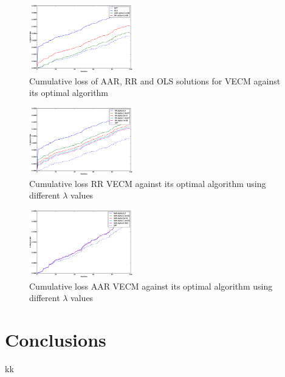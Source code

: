 \documentclass[twocolumn]{svjour3}          %
\begin{document}
\begin{figure}[!ht]
  \centering
  \includegraphics[width=0.4\textwidth]{onlinecomparison}
  \caption{Cumulative loss of AAR, RR and OLS solutions for VECM against its optimal algorithm}
  \label{fig:onlinecomparison}
\end{figure}


\begin{figure}[!ht]
  \centering
  \includegraphics[width=0.4\textwidth]{RRcomparison}
  \caption{Cumulative loss RR VECM against its optimal algorithm using different $\lambda$ values}
  \label{fig:RRcomparison}
\end{figure}


\begin{figure}[!ht]
  \centering
  \includegraphics[width=0.4\textwidth]{AARcomparison}
  \caption{Cumulative loss AAR VECM against its optimal algorithm using different $\lambda$ values}
  \label{fig:AARcomparison}
\end{figure}

\section{Conclusions}
\label{sec:conclusions}
kk


\end{document}
